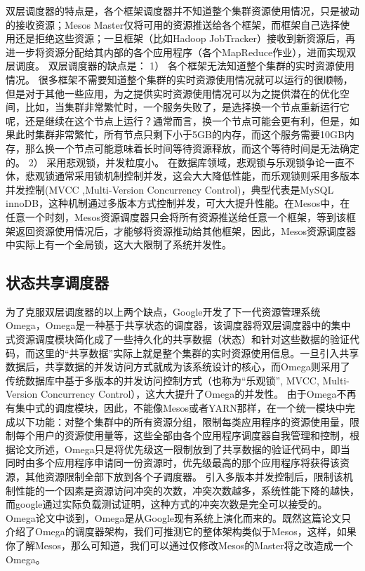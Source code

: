 双层调度器的特点是，各个框架调度器并不知道整个集群资源使用情况，只是被动的接收资源；Mesos Master仅将可用的资源推送给各个框架，而框架自己选择使用还是拒绝这些资源；一旦框架（比如Hadoop JobTracker）接收到新资源后，再进一步将资源分配给其内部的各个应用程序（各个MapReduce作业），进而实现双层调度。
双层调度器的缺点是：
1）  各个框架无法知道整个集群的实时资源使用情况。
很多框架不需要知道整个集群的实时资源使用情况就可以运行的很顺畅，但是对于其他一些应用，为之提供实时资源使用情况可以为之提供潜在的优化空间，比如，当集群非常繁忙时，一个服务失败了，是选择换一个节点重新运行它呢，还是继续在这个节点上运行？通常而言，换一个节点可能会更有利，但是，如果此时集群非常繁忙，所有节点只剩下小于5GB的内存，而这个服务需要10GB内存，那么换一个节点可能意味着长时间等待资源释放，而这个等待时间是无法确定的。
2）  采用悲观锁，并发粒度小。
在数据库领域，悲观锁与乐观锁争论一直不休，悲观锁通常采用锁机制控制并发，这会大大降低性能，而乐观锁则采用多版本并发控制(MVCC ,Multi-Version Concurrency Control)，典型代表是MySQL innoDB，这种机制通过多版本方式控制并发，可大大提升性能。在Mesos中，在任意一个时刻，Mesos资源调度器只会将所有资源推送给任意一个框架，等到该框架返回资源使用情况后，才能够将资源推动给其他框架，因此，Mesos资源调度器中实际上有一个全局锁，这大大限制了系统并发性。
\subsection{状态共享调度器}
为了克服双层调度器的以上两个缺点，Google开发了下一代资源管理系统Omega，Omega是一种基于共享状态的调度器，该调度器将双层调度器中的集中式资源调度模块简化成了一些持久化的共享数据（状态）和针对这些数据的验证代码，而这里的“共享数据”实际上就是整个集群的实时资源使用信息。一旦引入共享数据后，共享数据的并发访问方式就成为该系统设计的核心，而Omega则采用了传统数据库中基于多版本的并发访问控制方式（也称为“乐观锁”, MVCC, Multi-Version Concurrency Control），这大大提升了Omega的并发性。
由于Omega不再有集中式的调度模块，因此，不能像Mesos或者YARN那样，在一个统一模块中完成以下功能：对整个集群中的所有资源分组，限制每类应用程序的资源使用量，限制每个用户的资源使用量等，这些全部由各个应用程序调度器自我管理和控制，根据论文所述，Omega只是将优先级这一限制放到了共享数据的验证代码中，即当同时由多个应用程序申请同一份资源时，优先级最高的那个应用程序将获得该资源，其他资源限制全部下放到各个子调度器。
引入多版本并发控制后，限制该机制性能的一个因素是资源访问冲突的次数，冲突次数越多，系统性能下降的越快，而google通过实际负载测试证明，这种方式的冲突次数是完全可以接受的。
Omega论文中谈到，Omega是从Google现有系统上演化而来的。既然这篇论文只介绍了Omega的调度器架构，我们可推测它的整体架构类似于Mesos，这样，如果你了解Mesos，那么可知道，我们可以通过仅修改Mesos的Master将之改造成一个Omega。


